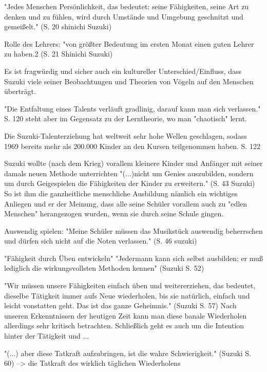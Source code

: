 "Jedes Menschen Persönlichkeit, das bedeutet: seine Fähigkeiten, seine Art zu
denken und zu fühlen, wird durch Umstände und Umgebung geschnitzt und
gemeißelt." (S. 20 shinichi Suzuki)

Rolle des Lehrers: "von größter Bedeutung im ersten Monat einen guten Lehrer zu
haben.2 (S. 21 Shinichi Suzuki)

Es ist fragwürdig und sicher auch ein kultureller Unterschied/Einfluss, dass Suzuki viele seiner Beobachtungen und Theorien von
Vögeln auf den Menschen überträgt. 

"Die Entfaltung eines Talents verläuft gradlinig, darauf kann man sich
verlassen." S. 120 \autocite[120]{suzuki:erziehung_ist_liebe} steht aber im Gegensatz zu der Lerntheorie, wo man
"chaotisch" lernt.

Die Suzuki-Talenterziehung hat weltweit sehr hohe Wellen geschlagen, sodass 1969
bereits mehr als 200.000 Kinder an den Kursen teilgenommen haben. S. 122






Suzuki wollte (nach dem Krieg) vorallem kleinere Kinder und Anfänger mit seiner
damals neuen Methode unterrichten "(...)nicht um Genies auszubilden, sondern um
durch Geigespielen die Fähigkeiten der Kinder zu erweitern." (S. 43 Suzuki) So
ist ihm die ganzheitliche menschliche Ausbildung nämlich ein wichtiges Anliegen
und er der Meinung, dass alle seine Schüler vorallem auch zu "edlen Menschen"
herangezogen wurden, wenn sie durch seine Schule gingen. 

Auswendig spielen: "Meine Schüler müssen das Musikstück auswendig beherrschen
und dürfen sich nicht auf die Noten verlassen." (S. 46 suzuki)

"Fähigkeit durch Üben entwickeln" "Jedermann kann sich selbst ausbilden; er muß
lediglich die wirkungsvollsten Methoden kennen" (Suzuki S. 52)

"Wir müssen unsere Fähigkeiten einfach üben und weitererziehen, das bedeutet,
dieselbe Tätigkeit immer aufs Neue wiederholen, bis sie natürlich, einfach und
leicht vonstatten geht. Das ist das ganze Geheimnis." (Suzuki S. 57)
Nach unseren Erkenntnissen der heutigen Zeit kann man diese banale Wiederholen
allerdings sehr kritisch betrachten. Schließlich geht es auch um die Intention
hinter der Tätigkeit und ...

"(...) aber diese Tatkraft aufzubringen, ist die wahre Schwierigkeit." (Suzuki
S. 60) --> die Tatkraft des wirklich täglichen Wiederholens

